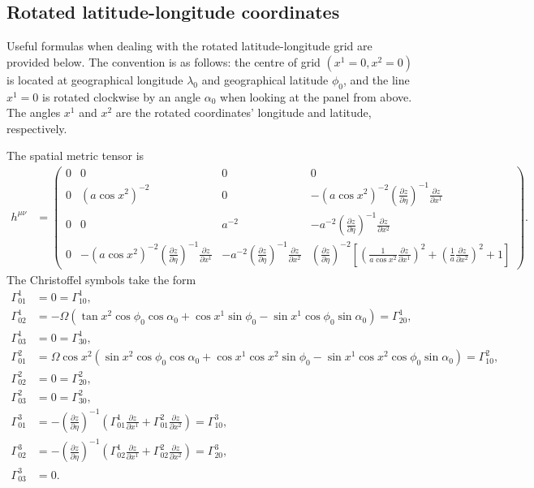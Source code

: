 \documentclass{article}
\begin{document}
\subsection{Rotated latitude-longitude coordinates}
Useful formulas when dealing with the rotated latitude-longitude grid are provided below. The convention is as follows: the centre of grid $(x^1=0,x^2=0)$ is located at geographical longitude $\lambda_0$ and geographical latitude $\phi_0$, and the line $x^1=0$ is rotated clockwise by an angle $\alpha_0$ when looking at the panel from above. The angles $x^1$ and $x^2$ are the rotated coordinates' longitude and latitude, respectively.

The spatial metric tensor is
\begin{align}
h^{\mu \nu}&=\left( \begin{array}{cccc}
0 & 0 & 0 & 0 \\
0 & (a\cos x^2)^{-2} & 0 & -(a\cos x^2)^{-2} \left( \frac{\partial z}{\partial \eta} \right)^{-1} \frac{\partial z}{\partial x^1}\\
0 & 0 & a^{-2} & -a^{-2} \left( \frac{\partial z}{\partial \eta} \right)^{-1} \frac{\partial z}{\partial x^2} \\
0 & -(a\cos x^2)^{-2} \left( \frac{\partial z}{\partial \eta} \right)^{-1} \frac{\partial z}{\partial x^1} & -a^{-2} \left( \frac{\partial z}{\partial \eta} \right)^{-1} \frac{\partial z}{\partial x^2} & \left( \frac{\partial z}{\partial \eta} \right)^{-2} \left[ \left( \frac{1}{a\cos x^2} \frac{\partial z}{\partial x^1} \right)^2+\left( \frac{1}{a} \frac{\partial z}{\partial x^2} \right)^2+1  \right]  \end{array} \right).
\end{align}
The Christoffel symbols take the form
\begin{align}
\Gamma^1_{01}&=0=\Gamma^1_{10}, \\
\Gamma^1_{02}&=-\Omega \left( \tan x^2\cos\phi_0\cos\alpha_0+\cos x^1\sin\phi_0-\sin x^1\cos\phi_0\sin\alpha_0 \right)=\Gamma^1_{20}, \\
\Gamma^1_{03}&=0=\Gamma^1_{30}, \\
\Gamma^2_{01}&=\Omega \cos x^2 \left( \sin x^2\cos\phi_0\cos\alpha_0 + \cos x^1\cos x^2\sin\phi_0-\sin x^1\cos x^2\cos\phi_0\sin\alpha_0 \right)=\Gamma^2_{10}, \\
\Gamma^2_{02}&=0=\Gamma^2_{20}, \\
\Gamma^2_{03}&=0=\Gamma^2_{30}, \\
\Gamma^3_{01}&=-\left( \frac{\partial z}{\partial \eta} \right)^{-1} \left( \Gamma^1_{01}\frac{\partial z}{\partial x^1} + \Gamma^2_{01}\frac{\partial z}{\partial x^2} \right)=\Gamma^3_{10}, \label{llg301} \\
\Gamma^3_{02}&=-\left( \frac{\partial z}{\partial \eta} \right)^{-1} \left( \Gamma^1_{02}\frac{\partial z}{\partial x^1} + \Gamma^2_{02}\frac{\partial z}{\partial x^2} \right)=\Gamma^3_{20}, \label{llg302} \\
\Gamma^3_{03}&=0.
\end{align}
\end{document}
